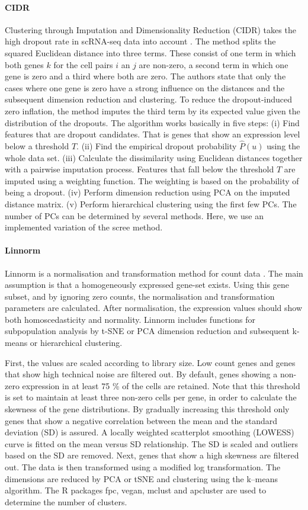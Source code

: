 \documentclass[12pt, a4paper]{article}\usepackage[]{graphicx}\usepackage[]{color}
\begin{document}
\paragraph{CIDR}
Clustering through Imputation and Dimensionality Reduction (CIDR) takes the high dropout rate in scRNA-seq data into account \citep{lin2017cidr}. The method splits the squared Euclidean distance into three terms. These consist of one term in which both genes $k$ for the cell pairs $i$ an $j$ are non-zero, a second term in which one gene is zero and a third where both are zero. The authors state that only the cases where one gene is zero have a strong influence on the distances and the subsequent dimension reduction and clustering. To reduce the dropout-induced zero inflation, the method imputes the third term by its expected value given the distribution of the dropouts. 
The algorithm works basically in five steps: (i) Find features that are dropout candidates. That is genes that show an expression level below a threshold $T$. (ii) Find the empirical dropout probability $\hat P(u)$ using the whole data set. (iii) Calculate the dissimilarity using Euclidean distances together with a pairwise imputation process. Features that fall below the threshold $T$ are imputed using a weighting function. The weighting is based on the probability of being a dropout. (iv) Perform dimension reduction using PCA on the imputed distance matrix. (v) Perform hierarchical clustering using the first few PCs. The number of PCs can be determined by several methods. Here, we use an implemented variation of the scree method. 
\paragraph{Linnorm }
Linnorm is a normalisation and transformation method for count data \citep{yip2017linnorm}. The main assumption is that a homogeneously expressed gene-set exists. Using this gene subset, and by ignoring zero counts, the normalisation and transformation parameters are calculated. After normalisation, the expression values should show both homoscedasticity and normality. Linnorm includes functions for subpopulation analysis by t-SNE or PCA dimension reduction and subsequent k-means or hierarchical clustering. 

First, the values are scaled according to library size. Low count genes and genes that show high technical noise are filtered out. By default, genes showing a non-zero expression in at least 75 \% of the cells are retained. Note that this threshold is set to maintain at least three non-zero cells per gene, in order to calculate the skewness of the gene distributions. By gradually increasing this threshold only genes that show a negative correlation between the mean and the standard deviation (SD) is assured. 
A locally weighted scatterplot smoothing (LOWESS) curve is fitted on the mean versus SD relationship. The SD is scaled and outliers based on the SD are removed. Next, genes that show a high skewness are filtered out. The data is then transformed using a modified log transformation.
The dimensions are reduced by PCA or tSNE and clustering using the k--means algorithm. The R packages fpc, vegan, mclust and apcluster are used to determine the number of clusters.
\end{document}
